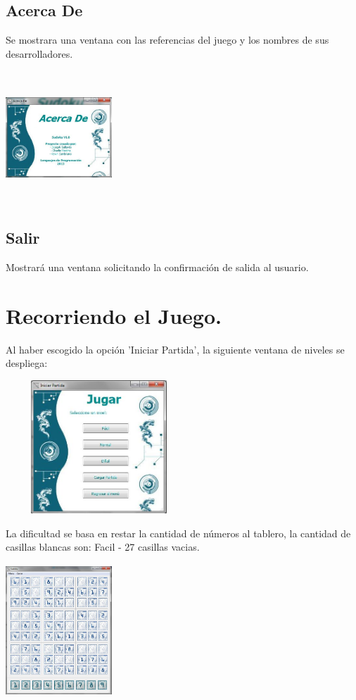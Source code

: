 \documentclass[12pt]{article}
\begin{document}
	\subsection{Acerca De}
		Se mostrara una ventana con las referencias del juego y los nombres de sus desarrolladores.

	\begin{center}
		\includegraphics[height=5cm,width=4cm]{acercade.jpg}
	\end{center}

	\subsection{Salir}
		Mostrará una ventana solicitando la confirmación de salida al usuario.

\section{Recorriendo el Juego.}
	Al haber escogido la opción 'Iniciar Partida', la siguiente ventana de niveles se despliega:
		\begin{center}
			\includegraphics[height=5cm,width=7cm]{jugar.jpg}
		\end{center}
	La dificultad se basa en restar la cantidad de números al tablero, la cantidad de casillas blancas son:
		Facil   - 27 casillas vacias.

		\begin{center}
			\includegraphics[height=5cm,width=4cm]{facil.jpg}
		\end{center}
\end{document}
